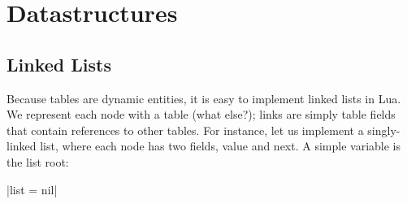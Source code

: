 \chapter{Datastructures}

\section{Linked Lists}

Because tables are dynamic entities, it is easy to implement linked lists in Lua. We represent each node
with a table (what else?); links are simply table fields that contain references to other tables. For instance,
let us implement a singly-linked list, where each node has two fields, value and next. A simple variable
is the list root:

|list = nil|

